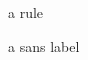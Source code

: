 \documentclass{article}
\begin{document}
\begin{rules}
\item[Step] a rule
\end{rules}
\begin{sfdesc}
\item[Sans] a sans label
\end{sfdesc}
\end{document}
